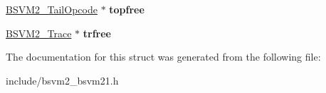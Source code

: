 \begin{DoxyCompactItemize}
\item 
\hypertarget{structBSVM2__CodeImage__s_a4cb72e3a23dfc30eebc253be0bcf73ae}{\hyperlink{structBSVM2__TailOpcode__s}{B\-S\-V\-M2\-\_\-\-Tail\-Opcode} $\ast$ {\bfseries topfree}}\label{structBSVM2__CodeImage__s_a4cb72e3a23dfc30eebc253be0bcf73ae}

\item 
\hypertarget{structBSVM2__CodeImage__s_a5df954e6c9a2e80c0abe3690df5576f5}{\hyperlink{structBSVM2__Trace__s}{B\-S\-V\-M2\-\_\-\-Trace} $\ast$ {\bfseries trfree}}\label{structBSVM2__CodeImage__s_a5df954e6c9a2e80c0abe3690df5576f5}

\end{DoxyCompactItemize}


The documentation for this struct was generated from the following file\-:\begin{DoxyCompactItemize}
\item 
include/bsvm2\-\_\-bsvm21.\-h\end{DoxyCompactItemize}
